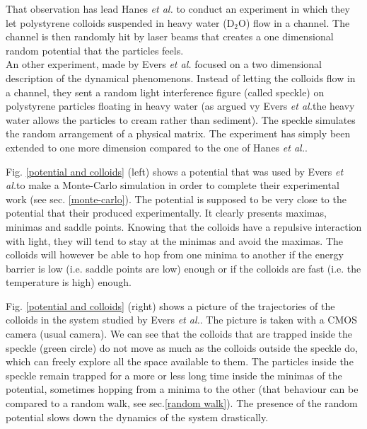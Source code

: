 \documentclass[a4paper,12pt]{article}
\newcommand{\jline}{\vspace{10pt}}
\newcommand{\etal}{\textit{et al.}}
\begin{document}
That observation has lead Hanes \etal \cite{Hanes2012} to conduct an experiment in which they let polystyrene colloids suspended in heavy water (D$_2$O) flow in a channel. The channel is then randomly hit by laser beams that creates a one dimensional random potential that the particles feels.\\
An other experiment, made by Evers \etal \cite{Evers2013} focused on a two dimensional description of the dynamical phenomenons. Instead of letting the colloids flow in a channel, they sent a random light interference figure (called speckle) on polystyrene particles floating in heavy water (as argued vy Evers \etal the heavy water allows the particles to cream rather than sediment). The speckle simulates the random arrangement of a physical matrix. The experiment has simply been extended to one more dimension compared to the one of Hanes \etal.\jline

Fig. \ref{potential and colloids} (left) shows a potential that was used by Evers \etal to make a Monte-Carlo simulation in order to complete their experimental work (see sec. \ref{monte-carlo}). The potential is supposed to be very close to the potential that their produced experimentally. It clearly  presents maximas, minimas and saddle points. Knowing that the colloids have a repulsive interaction with light, they will tend to stay at the minimas and avoid the maximas. The colloids will however be able to hop from one minima to another if the energy barrier is low (i.e. saddle points are low) enough or if the colloids are fast (i.e. the temperature is high) enough.\jline

Fig. \ref{potential and colloids} (right) shows a picture of the trajectories of the colloids in the system studied by Evers \etal. The picture is taken with a CMOS camera (usual camera). We can see that the colloids that are trapped inside the speckle (green circle) do not move as much as the colloids outside the speckle do, which can freely explore all the space available to them. The particles inside the speckle remain trapped for a more or less long time inside the minimas of the potential, sometimes hopping from a minima to the other (that behaviour can be compared to a random walk, see sec.\ref{random walk}). The presence of the random potential slows down the dynamics of the system drastically.\jline
\end{document}
